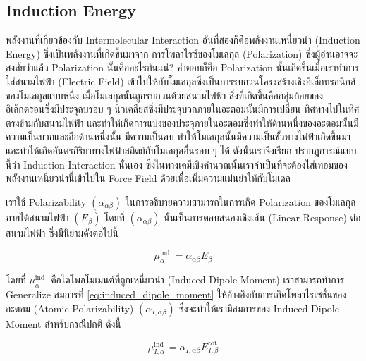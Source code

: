 \subsection{Induction Energy}

พลังงานที่เกี่ยวข้องกับ Intermolecular Interaction อันที่สองก็คือพลังงานเหนี่ยวนำ (Induction Energy) ซึ่งเป็นพลังงานที่เกิดขึ้นมาจาก%
การโพลาไรซ์ของโมเลกุล (Polarization) ซึ่งผู้อ่านอาจจะสงสัยว่าแล้ว Polarization นั้นคืออะไรกันแน่? คำตอบก็คือ Polarization
นั้นเกิดขึ้นเมื่อเราทำการใส่สนามไฟฟ้า (Electric Field) เข้าไปให้กับโมเลกุลซึ่งเป็นการรบกวนโครงสร้างเชิงอิเล็กทรอนิกส์ของโมเลกุลแบบหนึ่ง
เมื่อโมเลกุลนั้นถูกรบกวนด้วยสนามไฟฟ้า สิ่งที่เกิดขึ้นคือกลุ่มก้อยของอิเล็กตรอนซึ่งมีประจุลบรอบ ๆ นิวเคลียสซึ่งมีประจุบวกภายในอะตอมนั้นมีการเปลี่ยน%
ทิศทางไปในทิศตรงข้ามกับสนามไฟฟ้า และทำให้เกิดการแบ่งของประจุภายในอะตอมซึ่งทำให้ด้านหนึ่งของอะตอมนั้นมีความเป็นบวกและอีกด้านหนึ่งนั้น%
มีความเป็นลบ ทำให้โมเลกุลนั้นมีความเป็นขั้วทางไฟฟ้าเกิดขึ้นมาและทำให้เกิดอันตรกิริยาทางไฟฟ้าสถิตย์กับโมเลกุลอื่นรอบ ๆ ได้ ดังนั้นเราจึงเรียก%
ปรากฏการณ์แบบนี้ว่า Induction Interaction นั่นเอง ซึ่งในทางเคมีเชิงคำนวณนั้นเราจำเป็นที่จะต้องใส่เทอมของพลังงานเหนี่ยวนำนี้เข้าไปใน
Force Field ด้วยเพื่อเพิ่มความแม่นยำให้กับโมเดล

เราใช้ Polarizability $(\alpha_{\alpha \beta})$ ในการอธิบายความสามารถในการเกิด Polarization ของโมเลกุลภายใต้สนามไฟฟ้า
$(E_{\beta})$ โดยที่ $(\alpha_{\alpha \beta})$ นั้นเป็นการตอบสนองเชิงเส้น (Linear Response) ต่อสนามไฟฟ้า ซึ่งมีนิยามดังต่อไปนี้

\begin{equation}
  \label{eq:induced_dipole_moment}
  \mu_\alpha^{\text {ind }}
  =
  \alpha_{\alpha \beta} E_\beta
\end{equation}

\noindent โดยที่ $\mu_\alpha^{\text {ind }}$ คือไดโพลโมเมนต์ที่ถูกเหนี่ยวนำ (Induced Dipole Moment) เราสามารถทำการ
Generalize สมการที่ \eqref{eq:induced_dipole_moment} ให้อ้างอิงกับการเกิดโพลาไรเซชั่นของอะตอม (Atomic Polarizability)
$(\alpha_{I, \alpha \beta})$ ซึ่งจะทำให้เรามีสมการของ Induced Dipole Moment สำหรับกรณีปกติ ดังนี้

\begin{equation}
  \mu_{I, \alpha}^{\text {ind }}
  =
  \alpha_{I, \alpha \beta} E_{I, \beta}^{\mathrm{tot}}
\end{equation}

